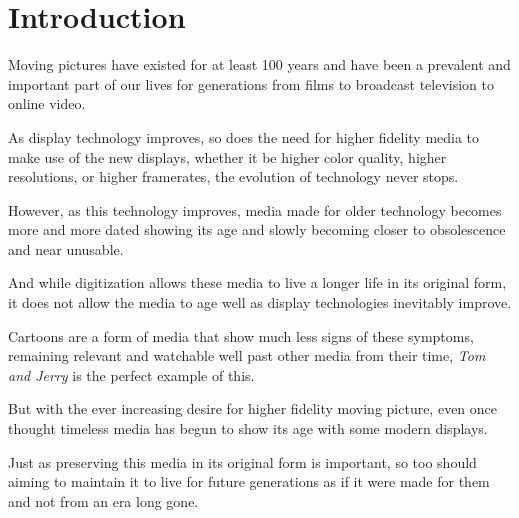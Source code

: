 \documentclass[12pt]{article}
\newcommand{\sentence}{} %
\newcommand{\italic}[1]{\textit{#1}}
\begin{document}

    \pagebreak

    \renewcommand*\contentsname{
    \begin{center}
        Table of Contents
    \end{center}}

    \tableofcontents

    \pagebreak



    \section{Introduction}\label{sec:introduction}

    \tab
    Moving pictures have existed for at least 100 years and have been a prevalent and important part of our lives for
    generations from films to broadcast television to online video.
    \sentence
    As display technology improves, so does the need for higher fidelity media to make use of the new displays,
    whether it be higher color quality, higher resolutions, or higher framerates, the evolution of technology never
    stops.
    \sentence
    However, as this technology improves, media made for older technology becomes more and more dated showing its age
    and slowly becoming closer to obsolescence and near unusable.
    \sentence
    And while digitization allows these media to live a longer life in its original form, it does not allow the media
    to age well as display technologies inevitably improve.
    \sentence
    Cartoons are a form of media that show much less signs of these symptoms, remaining relevant and watchable well
    past other media from their time, \italic{Tom and Jerry} is the perfect example of this.
    \sentence
    But with the ever increasing desire for higher fidelity moving picture, even once thought timeless media has
    begun to show its age with some modern displays.
    \sentence
    Just as preserving this media in its original form is important, so too should aiming to maintain it to live for
    future generations as if it were made for them and not from an era long gone.
\end{document}
